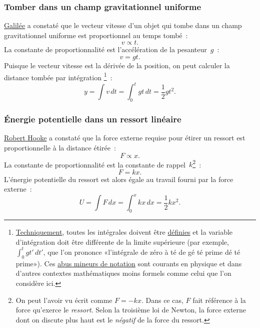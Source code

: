     \subsubsection{Tomber dans un champ gravitationnel uniforme} %
    \label{sec:falling_in_a_uniform_gravitational_field}

\href{https://fr.wikipedia.org/wiki/Galil%C3%A9e_(savant)}{Galilée} a constaté
que le vecteur vitesse d'un objet qui tombe dans un champ gravitationnel
uniforme est proportionnel au temps tombé~:
\[ v \propto t. \]
La constante de proportionnalité est l'accélération de la pesanteur~$g$~:
\[ v = g t. \]
Puisque le vecteur vitesse est la dérivée de la position, on peut calculer la
distance tombée par
intégration\ns
\footnote{\href{https://translate.google.com/translate?hl=en&sl=en&tl=fr&u=https://www.explainxkcd.com/wiki/index.php/1475:_Technically}{Techniquement},
toutes les intégrales doivent être
\href{https://translate.google.com/#view=home&op=translate&sl=en&tl=fr&text=https://mathworld.wolfram.com/DefiniteIntegral.html}{définies}
et la variable d'intégration doit être
différente de la limite supérieure (par exemple, $\int_{0}^{t} gt'\, dt'$, que
l'on prononce «\ns l'intégrale de zéro à té de gé té prime dé té prime\ns »). Ces
\href{https://fr.wikipedia.org/wiki/Abus_de_notation}{abus mineurs de notation}
sont courants en physique et dans d'autres contextes mathématiques moins formels
comme celui que l'on considère ici.}~:
\[ y = \int v\,dt = \int_0^t gt\,dt = \textstyle{\frac{1}{2}} gt^2. \]


    \subsubsection{Énergie potentielle dans un ressort linéaire} %
    \label{sec:potential_energy_in_a_linear_spring}

\href{https://fr.wikipedia.org/wiki/Robert_Hooke}{Robert Hooke} a constaté que
la force externe requise pour étirer un ressort est proportionnelle à la
distance étirée~:
\[ F \propto x. \]
La constante de proportionnalité est la constante de rappel~$k$\ns\footnote{On
peut l'avoir vu écrit comme $F=-kx$. Dans ce cas, $F$ fait référence à la
force qu'exerce le \emph{ressort}. Selon la troisième loi de Newton, la force
externe dont on discute plus haut est le \emph{négatif} de la force du ressort.}~:
\[ F = k x. \]
L'énergie potentielle du ressort est alors égale au travail fourni par la force
externe~:
\[ U = \int F\,dx = \int_0^x kx\,dx = \textstyle{\frac{1}{2}} kx^2. \]

